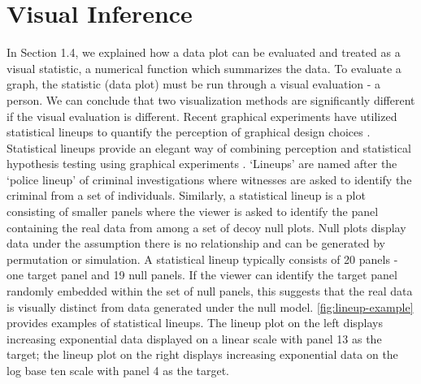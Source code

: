 \documentclass[12pt]{article}
\begin{document}
\hypertarget{visual-inference}{%
\section{Visual Inference}\label{visual-inference}}

In Section 1.4, we explained how a data plot can be evaluated and
treated as a visual statistic, a numerical function which summarizes the
data. To evaluate a graph, the statistic (data plot) must be run through
a visual evaluation - a person. We can conclude that two visualization
methods are significantly different if the visual evaluation is
different. Recent graphical experiments have utilized statistical
lineups to quantify the perception of graphical design choices
\citep{hofmann_graphical_2012, loy_model_2017, loy_variations_2016, vanderplas_clusters_2017}.
Statistical lineups provide an elegant way of combining perception and
statistical hypothesis testing using graphical experiments
\citep{majumder_validation_2013, vanderplas_testing_2020, wickham2010graphical}.
`Lineups' are named after the `police lineup' of criminal investigations
where witnesses are asked to identify the criminal from a set of
individuals. Similarly, a statistical lineup is a plot consisting of
smaller panels where the viewer is asked to identify the panel
containing the real data from among a set of decoy null plots. Null
plots display data under the assumption there is no relationship and can
be generated by permutation or simulation. A statistical lineup
typically consists of 20 panels - one target panel and 19 null panels.
If the viewer can identify the target panel randomly embedded within the
set of null panels, this suggests that the real data is visually
distinct from data generated under the null model.
\cref{fig:lineup-example} provides examples of statistical lineups. The
lineup plot on the left displays increasing exponential data displayed
on a linear scale with panel 13 as the target; the lineup plot on the
right displays increasing exponential data on the log base ten scale
with panel 4 as the target.
\end{document}
